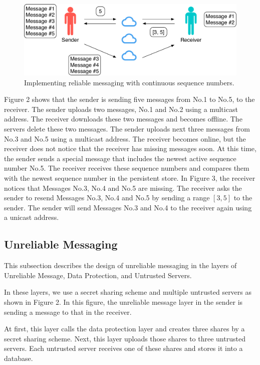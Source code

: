 \documentclass[twocolumn,10pt]{article}
\begin{document}
\begin{figure}[t]
	\centering
	\includegraphics[scale=0.38]{reliable_sync}
	\caption{Implementing reliable messaging with continuous sequence numbers.}
\end{figure}

Figure 2 shows that the sender is sending five messages from No.1 to No.5, to the receiver.
The sender uploads two messages, No.1 and No.2 using a multicast address.
The receiver downloads these two messages and becomes offline.
The servers delete these two messages.
The sender uploads next three messages from No.3 and No.5  using a multicast address.
The receiver becomes online, but the receiver does not notice that the receiver has missing messages soon.
At this time, the sender sends a special message that includes the newest active sequence number No.5.
The receiver receives these sequence numbers and compares them with the newest sequence number in the persistent store.
In Figure 3, the receiver notices that Messages No.3, No.4 and No.5 are missing.
The receiver asks the sender to resend Messages No.3, No.4 and No.5 by sending a range $[3, 5]$ to the sender.
The sender will send Messages No.3 and No.4 to the receiver again using a unicast address.

\subsection{Unreliable Messaging}

This subsection describes the design of unreliable messaging in the layers of Unreliable Message, Data Protection, and Untrusted Servers.

In these layers, we use a secret sharing scheme and multiple untrusted servers as shown in Figure 2.
In this figure, the unreliable message layer in the sender is sending a message to that in the receiver.

At first, this layer calls the data protection layer and creates three shares by a secret sharing scheme.
Next, this layer uploads those shares to three untrusted servers.
Each untrusted server receives one of these shares and stores it into a database.
\end{document}
